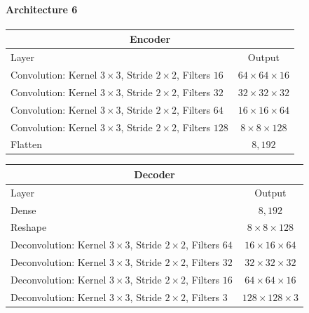 \paragraph{Architecture 6}

\begin{center}
    \begin{table}[H]
        \centering
        \begin{tabular}{ | l | c | }
            \multicolumn{2}{c}{Encoder} \\ \hline
            Layer & Output\\ \hline
            Convolution: Kernel $3\times3$, Stride $2\times2$, Filters $16 $    & $64\times 64\times 16 $    \\  
            Convolution: Kernel $3\times3$, Stride $2\times2$, Filters $32 $    & $32\times 32\times 32 $    \\
            Convolution: Kernel $3\times3$, Stride $2\times2$, Filters $64 $    & $16\times 16\times 64 $    \\
            Convolution: Kernel $3\times3$, Stride $2\times2$, Filters $128$    & $8\times 8\times   128$    \\
            Flatten                                                             & $8,192$                    \\
            \hline
        \end{tabular} 
    \end{table}
\end{center}
\vspace{-4em}
\begin{center}
    \begin{table}[H]
        \centering
        \begin{tabular}{ | l | c | }
            \multicolumn{2}{c}{Decoder} \\ \hline
            Layer & Output\\ \hline
            Dense                                                                   & $8,192$                   \\
            Reshape                                                                 & $8\times 8\times    128$  \\ 
            Deconvolution: Kernel $3\times3$, Stride $2\times2$, Filters $64 $      & $16\times 16\times  64 $  \\
            Deconvolution: Kernel $3\times3$, Stride $2\times2$, Filters $32 $      & $32\times 32\times  32 $  \\
            Deconvolution: Kernel $3\times3$, Stride $2\times2$, Filters $16 $      & $64\times 64\times  16 $  \\
            Deconvolution: Kernel $3\times3$, Stride $2\times2$, Filters $3  $      & $128\times 128\times3  $  \\
            \hline
        \end{tabular} 
    \end{table}
\end{center}

